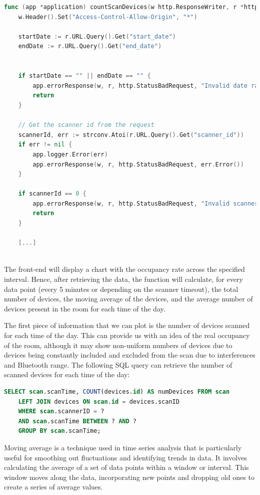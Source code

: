\documentclass[a4paper, 11pt]{article}
\begin{document}
\begin{lstlisting}[language=Go]
func (app *application) countScanDevices(w http.ResponseWriter, r *http.Request) {
	w.Header().Set("Access-Control-Allow-Origin", "*")

	startDate := r.URL.Query().Get("start_date")
	endDate := r.URL.Query().Get("end_date")


	if startDate == "" || endDate == "" {
		app.errorResponse(w, r, http.StatusBadRequest, "Invalid date range")
		return
	}

	// Get the scanner id from the request
	scannerId, err := strconv.Atoi(r.URL.Query().Get("scanner_id"))
	if err != nil {
		app.logger.Error(err)
		app.errorResponse(w, r, http.StatusBadRequest, err.Error())
	}

	if scannerId == 0 {
		app.errorResponse(w, r, http.StatusBadRequest, "Invalid scanner id")
		return
	}
	
	[...]
	
\end{lstlisting}

The front-end will display a chart with the occupancy rate across the specified interval. Hence, after retrieving the data, the function will calculate, for every data point (every 5 minutes or depending on the scanner timeout), the total number of devices, the moving average of the devices, and the average number of devices present in the room for each time of the day.

The first piece of information that we can plot is the number of devices scanned for each time of the day. This can provide us with an idea of the real occupancy of the room, although it may show non-uniform numbers of devices due to devices being constantly included and excluded from the scan due to interferences and Bluetooth range. The following SQL query can retrieve the number of scanned devices for each time of the day:

\begin{lstlisting}[language=SQL]
	SELECT scan.scanTime, COUNT(devices.id) AS numDevices FROM scan
	LEFT JOIN devices ON scan.id = devices.scanID
	WHERE scan.scannerID = ?
	AND scan.scanTime BETWEEN ? AND ?
	GROUP BY scan.scanTime;
\end{lstlisting}

Moving average is a technique used in time series analysis that is particularly useful for smoothing out fluctuations and identifying trends in data. It involves calculating the average of a set of data points within a window or interval. This window moves along the data, incorporating new points and dropping old ones to create a series of average values.
\end{document}

